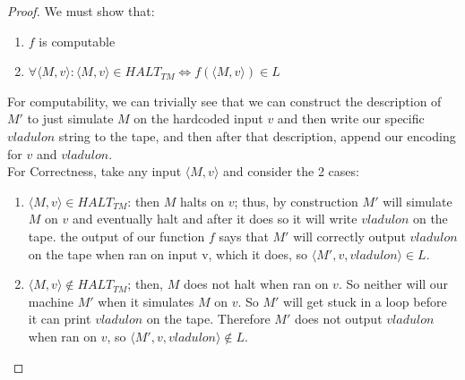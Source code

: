 \documentclass[a4paper,11pt]{article}
\begin{document}
	\begin{proof}
		We must show that:
		\begin{enumerate}
			\item $f$ is computable
			\item $\forall\langle M,v\rangle: \langle M,v\rangle\in HALT_{TM} \iff f(\langle M,v\rangle)\in L$
		\end{enumerate}

		For computability, we can trivially see that we can construct the description of $M'$ to just simulate $M$ on the hardcoded input $v$ and then write our specific $vladulon$ string to the tape, and then after that description, append our encoding for $v$ and $vladulon$.\\

		For Correctness, take any input $\langle M,v \rangle$ and consider the 2 cases:
		\begin{enumerate}
			\item $\langle M,v \rangle\in HALT_{TM}$: then $M$ halts on $v$; thus, by construction $M'$ will simulate $M$ on $v$ and eventually halt and after it does so it will write $vladulon$ on the tape. the output of our function $f$ says that $M'$ will correctly output $vladulon$ on the tape when ran on input v, which it does, so $\langle M',v,vladulon\rangle\in L$.
			\item $\langle M,v \rangle\notin HALT_{TM}$; then, $M$ does not halt when ran on $v$. So neither will our machine $M'$ when it simulates $M$ on $v$. So $M'$ will get stuck in a loop before it can print $vladulon$ on the tape. Therefore $M'$ does not output $vladulon$ when ran on $v$, so $\langle M',v,vladulon\rangle\notin L$.
		\end{enumerate}
	\end{proof}
\end{document}
